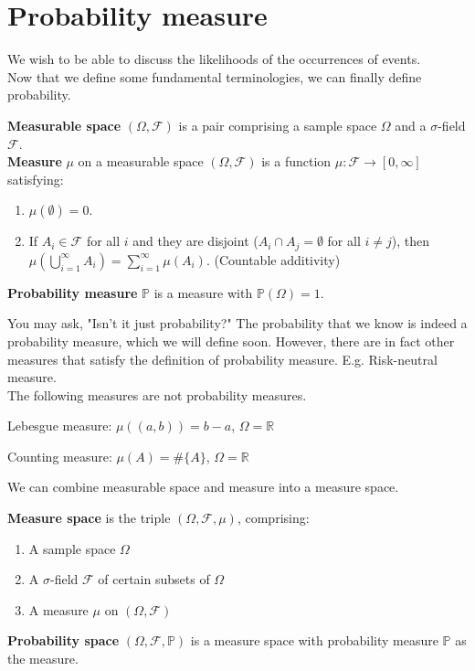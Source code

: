 \documentclass{huhtakm-template-book}
\newcommand{\prob}{\mathbb{P}}
\begin{document}
\section{Probability measure}
    We wish to be able to discuss the likelihoods of the occurrences of events.\\
    Now that we define some fundamental terminologies, we can finally define probability.
    \begin{defn}
        \textbf{Measurable space} $(\Omega,\mathcal{F})$ is a pair comprising a sample space $\Omega$ and a $\sigma$-field $\mathcal{F}$.\\
        \textbf{Measure} $\mu$ on a measurable space $(\Omega,\mathcal{F})$ is a function $\mu:\mathcal{F}\to [0,\infty]$ satisfying:
        \begin{enumerate}
            \item $\mu(\emptyset)=0$.
            \item If $A_{i}\in\mathcal{F}$ for all $i$ and they are disjoint ($A_{i}\cap A_{j}=\emptyset$ for all $i\neq j$), then $\mu(\bigcup_{i=1}^{\infty}A_{i})=\sum_{i=1}^{\infty}\mu(A_{i})$. (Countable additivity)
        \end{enumerate}
        \textbf{Probability measure} $\prob$ is a measure with $\prob(\Omega)=1$.
    \end{defn}
    You may ask, "Isn't it just probability?" The probability that we know is indeed a probability measure, which we will define soon. However, there are in fact other measures that satisfy the definition of probability measure. E.g. Risk-neutral measure.\\
    The following measures are not probability measures.
    \begin{eg}
        Lebesgue measure: $\mu((a,b))=b-a$, $\Omega=\mathbb{R}$
    \end{eg}
    \begin{eg}
        Counting measure: $\mu(A)=\#\{A\}$, $\Omega=\mathbb{R}$
    \end{eg}
    We can combine measurable space and measure into a measure space.
    \begin{defn}
        \textbf{Measure space} is the triple $(\Omega,\mathcal{F},\mu)$, comprising:
        \begin{enumerate}
            \item A sample space $\Omega$
            \item A $\sigma$-field $\mathcal{F}$ of certain subsets of $\Omega$
            \item A measure $\mu$ on $(\Omega,\mathcal{F})$
        \end{enumerate}
        \textbf{Probability space} $(\Omega,\mathcal{F},\prob)$ is a measure space with probability measure $\prob$ as the measure.
    \end{defn}
\end{document}
